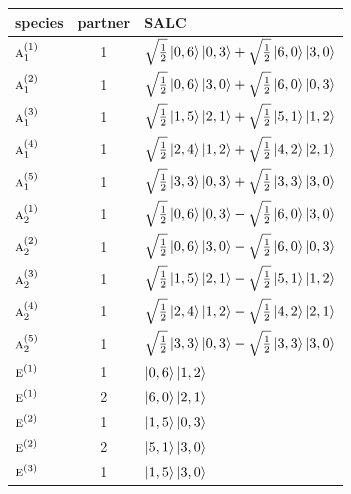 \documentclass[11pt]{article}
\newcommand{\irr}[1]{\text{\normalfont\scshape #1}}
\begin{document}
\begin{longtable}{l c p{}}\hline species & partner & SALC\\ \hline\endhead

$\irr{a}_{1}^{(1)}$ & 1 & $\sqrt{\tfrac{1}{2}}\ket{0,6}\ket{0,3}+\sqrt{\tfrac{1}{2}}\ket{6,0}\ket{3,0}$\\

$\irr{a}_{1}^{(2)}$ & 1 & $\sqrt{\tfrac{1}{2}}\ket{0,6}\ket{3,0}+\sqrt{\tfrac{1}{2}}\ket{6,0}\ket{0,3}$\\

$\irr{a}_{1}^{(3)}$ & 1 & $\sqrt{\tfrac{1}{2}}\ket{1,5}\ket{2,1}+\sqrt{\tfrac{1}{2}}\ket{5,1}\ket{1,2}$\\

$\irr{a}_{1}^{(4)}$ & 1 & $\sqrt{\tfrac{1}{2}}\ket{2,4}\ket{1,2}+\sqrt{\tfrac{1}{2}}\ket{4,2}\ket{2,1}$\\

$\irr{a}_{1}^{(5)}$ & 1 & $\sqrt{\tfrac{1}{2}}\ket{3,3}\ket{0,3}+\sqrt{\tfrac{1}{2}}\ket{3,3}\ket{3,0}$\\

$\irr{a}_{2}^{(1)}$ & 1 & $\sqrt{\tfrac{1}{2}}\ket{0,6}\ket{0,3}-\sqrt{\tfrac{1}{2}}\ket{6,0}\ket{3,0}$\\

$\irr{a}_{2}^{(2)}$ & 1 & $\sqrt{\tfrac{1}{2}}\ket{0,6}\ket{3,0}-\sqrt{\tfrac{1}{2}}\ket{6,0}\ket{0,3}$\\

$\irr{a}_{2}^{(3)}$ & 1 & $\sqrt{\tfrac{1}{2}}\ket{1,5}\ket{2,1}-\sqrt{\tfrac{1}{2}}\ket{5,1}\ket{1,2}$\\

$\irr{a}_{2}^{(4)}$ & 1 & $\sqrt{\tfrac{1}{2}}\ket{2,4}\ket{1,2}-\sqrt{\tfrac{1}{2}}\ket{4,2}\ket{2,1}$\\

$\irr{a}_{2}^{(5)}$ & 1 & $\sqrt{\tfrac{1}{2}}\ket{3,3}\ket{0,3}-\sqrt{\tfrac{1}{2}}\ket{3,3}\ket{3,0}$\\

$\irr{e}^{(1)}$ & 1 & $\ket{0,6}\ket{1,2}$\\

$\irr{e}^{(1)}$ & 2 & $\ket{6,0}\ket{2,1}$\\

$\irr{e}^{(2)}$ & 1 & $\ket{1,5}\ket{0,3}$\\

$\irr{e}^{(2)}$ & 2 & $\ket{5,1}\ket{3,0}$\\

$\irr{e}^{(3)}$ & 1 & $\ket{1,5}\ket{3,0}$\\


\end{longtable}
\end{document}
